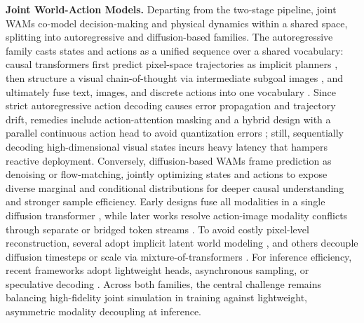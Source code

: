 \textbf{Joint World-Action Models.}
Departing from the two-stage pipeline, joint WAMs co-model decision-making and physical dynamics within a shared space, splitting into autoregressive and diffusion-based families. The autoregressive family casts states and actions as a unified sequence over a shared vocabulary: causal transformers first predict pixel-space trajectories as implicit planners \cite{wu2024unleashing, cheang2024gr}, then structure a visual chain-of-thought via intermediate subgoal images \cite{zhao2025cot}, and ultimately fuse text, images, and discrete actions into one vocabulary \cite{cen2025worldvla}. Since strict autoregressive action decoding causes error propagation and trajectory drift, remedies include action-attention masking \cite{cen2025worldvla} and a hybrid design with a parallel continuous action head to avoid quantization errors \cite{cen2025rynnvla}; still, sequentially decoding high-dimensional visual states incurs heavy latency that hampers reactive deployment. Conversely, diffusion-based WAMs frame prediction as denoising or flow-matching, jointly optimizing states and actions to expose diverse marginal and conditional distributions for deeper causal understanding and stronger sample efficiency. Early designs fuse all modalities in a single diffusion transformer \cite{guo2024prediction,shen2026videovla,kim2026cosmos}, while later works resolve action-image modality conflicts through separate or bridged token streams \cite{won2025dual,yang2025covar,chen2025unified}. To avoid costly pixel-level reconstruction, several adopt implicit latent world modeling \cite{zheng2025flare,zhao2026frappe,li2026world,yuan2026adaworldpolicy}, and others decouple diffusion timesteps or scale via mixture-of-transformers \cite{zhu2025unified,bi2025motus,team2026motubrain,lyu2026lda}. For inference efficiency, recent frameworks adopt lightweight heads, asynchronous sampling, or speculative decoding \cite{li2025unified,ye2026gigaworld,yuan2026fast,guo2026unified,deng2026dexworldmodel}. Across both families, the central challenge remains balancing high-fidelity joint simulation in training against lightweight, asymmetric modality decoupling at inference.

